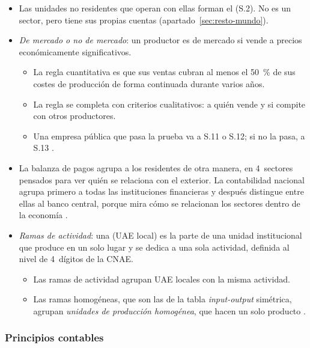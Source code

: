 \documentclass[11pt]{article}
\begin{document}
\begin{itemize}
\item Las unidades no residentes que operan con ellas forman el  (S.2). No es un sector, pero tiene sus propias cuentas (apartado~\ref{sec:resto-mundo}).
\item \emph{De mercado o no de mercado}: un productor es de mercado si vende a precios económicamente significativos.
  \begin{itemize}
  \item La regla cuantitativa es que sus ventas cubran al menos el 50~\% de sus costes de producción de forma continuada durante varios años\nocite{SEC2010}.
  \item La regla se completa con criterios cualitativos: a quién vende y si compite con otros productores.
  \item Una empresa pública que pasa la prueba va a S.11 o S.12; si no la pasa, a S.13 .
  \end{itemize}
\item La balanza de pagos agrupa a los residentes de otra manera, en 4~sectores pensados para ver quién se relaciona con el exterior. La contabilidad nacional agrupa primero a todas las instituciones financieras y después distingue entre ellas al banco central, porque mira cómo se relacionan los sectores dentro de la economía .
\item \emph{Ramas de actividad}: una  (UAE local) es la parte de una unidad institucional que produce en un solo lugar y se dedica a una sola actividad, definida al nivel de 4~dígitos de la CNAE.
  \begin{itemize}
  \item Las ramas de actividad agrupan UAE locales con la misma actividad.
  \item Las ramas homogéneas, que son las de la tabla \emph{input-output} simétrica, agrupan \emph{unidades de producción homogénea}, que hacen un solo producto\nocite{SEC2010} .
  \end{itemize}
\end{itemize}

\begin{infografia}[H]
\centering
\caption{Cómo se asigna una unidad institucional a su sector}\label{figu:sectores}
\end{infografia}

\subsubsection{Principios contables}\label{sec:principios}
\end{document}
